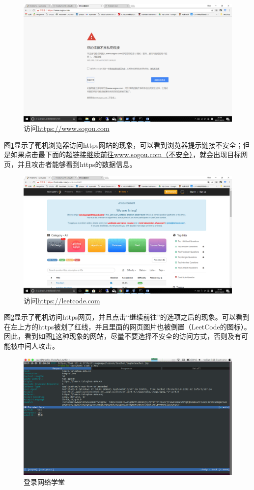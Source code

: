 \documentclass[a4paper]{article}
\begin{document}
\begin{figure}[htp]
\centering
\includegraphics[width=0.9\linewidth]{error.png}
\caption{访问\uline{https://www.sogou.com}}
\label{fig:error}
\end{figure}

图\ref{fig:error}显示了靶机浏览器访问https网站的现象，可以看到浏览器提示链接不安全；但是如果点击最下面的超链接\uline{继续前往www.sogou.com（不安全）}，就会出现目标网页，并且攻击者能够看到https的数据信息。

\begin{figure}[htp]
\centering
\includegraphics[width=0.9\linewidth]{leet.png}
\caption{访问\uline{https://leetcode.com}}
\label{fig:leetcode}
\end{figure}

图\ref{fig:leetcode}显示了靶机访问https网页，并且点击“继续前往”的选项之后的现象。可以看到在左上方的https被划了红线，并且里面的网页图片也被倒置（LeetCode的图标）。因此，看到如图\ref{fig:error}这种现象的网站，尽量不要选择不安全的访问方式，否则及有可能被中间人攻击。

\begin{figure}[htp]
\centering
\includegraphics[width=0.9\linewidth]{wlxt.png}
\caption{登录网络学堂}
\label{fig:wlxt}
\end{figure}
\end{document}
